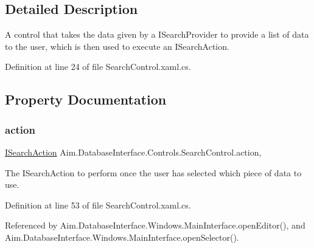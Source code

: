 \subsection{Detailed Description}
A control that takes the data given by a I\+Search\+Provider to provide a list of data to the user, which is then used to execute an I\+Search\+Action. 



Definition at line 24 of file Search\+Control.\+xaml.\+cs.



\subsection{Property Documentation}
\mbox{\label{class_aim_1_1_database_interface_1_1_controls_1_1_search_control_a7cb34e10b5e81dbccf9b8c94dd59cb58}} 
\subsubsection{\texorpdfstring{action}{action}}
{\footnotesize\ttfamily \mbox{\hyperlink{interface_aim_1_1_database_interface_1_1_interfaces_1_1_i_search_action}{I\+Search\+Action}} Aim.\+Database\+Interface.\+Controls.\+Search\+Control.\+action\hspace{0.3cm}{\ttfamily [get]}, {\ttfamily [set]}}



The I\+Search\+Action to perform once the user has selected which piece of data to use. 



Definition at line 53 of file Search\+Control.\+xaml.\+cs.



Referenced by Aim.\+Database\+Interface.\+Windows.\+Main\+Interface.\+open\+Editor(), and Aim.\+Database\+Interface.\+Windows.\+Main\+Interface.\+open\+Selector().

\mbox{\label{class_aim_1_1_database_interface_1_1_controls_1_1_search_control_a1ba1ac27ae1b2d28ea7bfd88e55be8a7}} 
